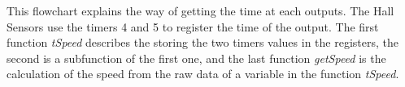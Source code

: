 This flowchart explains the way of getting the time at each outputs. The Hall Sensors use the timers 4 and 5 to register the time of the output. The first function \textit{tSpeed} describes the storing the two timers values in the registers, the second is a subfunction of the first one, and the last function \textit{getSpeed} is the calculation of the speed from the raw data of a variable in the function \textit{tSpeed}.